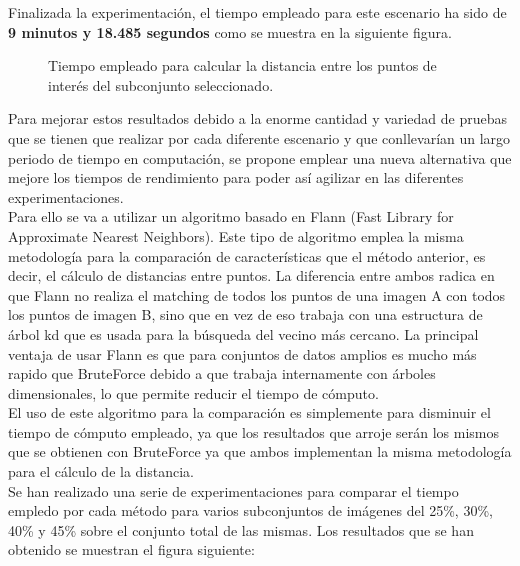 Finalizada la experimentación, el tiempo empleado para este escenario ha sido de \textbf{9 minutos y 18.485 segundos} como se muestra en la siguiente figura. \\

\begin{figure}[htbp]
\centering
{}
\caption{Tiempo empleado para calcular la distancia entre los puntos de interés del subconjunto seleccionado.} \label{fig:señales}
\end{figure} 

\vspace{100mm}

Para mejorar estos resultados debido a la enorme cantidad y variedad de pruebas que se tienen que realizar por cada diferente escenario y que conllevarían un largo periodo de tiempo en computación, se propone emplear una nueva alternativa que mejore los tiempos de rendimiento para poder así agilizar en las diferentes experimentaciones. \\

Para ello se va a utilizar un algoritmo basado en Flann (Fast Library for Approximate Nearest Neighbors). Este tipo de algoritmo emplea la misma metodología para la comparación de características que el método anterior, es decir, el cálculo de distancias entre puntos. La diferencia entre ambos radica en que Flann no realiza el matching de todos los puntos de una imagen A con todos los puntos de imagen B, sino que en vez de eso trabaja con una estructura de árbol kd que es usada para la búsqueda del vecino más cercano. La principal ventaja de usar Flann es que para conjuntos de datos amplios es mucho más rapido que BruteForce debido a que trabaja internamente con árboles dimensionales, lo que permite reducir el tiempo de cómputo. \\

El uso de este algoritmo para la comparación es simplemente para disminuir el tiempo de cómputo empleado, ya que los resultados que arroje serán los mismos que se obtienen con BruteForce ya que ambos implementan la misma metodología para el cálculo de la distancia. \\

Se han realizado una serie de experimentaciones para comparar el tiempo empledo por cada método para varios subconjuntos de imágenes del 25\%, 30\%, 40\% y 45\% sobre el conjunto total de las mismas. Los resultados que se han obtenido se muestran el figura siguiente:




